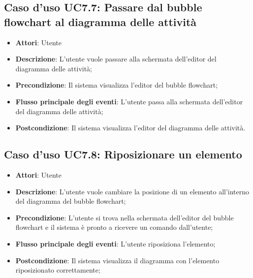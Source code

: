 \documentclass[../AnalisiDeiRequisiti.tex]{subfiles}
\begin{document}
				\subsection{Caso d'uso UC7.7: Passare dal bubble flowchart al diagramma delle attività}
				\begin{itemize}
					\item \textbf{Attori}: Utente
					\item \textbf{Descrizione}: L'utente vuole passare alla schermata dell'editor del diagramma delle attività;
					\item \textbf{Precondizione}: Il sistema visualizza l'editor del bubble flowchart;
					\item \textbf{Flusso principale degli eventi}: L'utente passa alla schermata dell'editor del diagramma delle attività;
					\item \textbf{Postcondizione}: Il sistema visualizza l'editor del diagramma delle attività.
				\end{itemize}
				\subsection{Caso d'uso UC7.8: Riposizionare un elemento}
				\begin{itemize}
					\item \textbf{Attori}: Utente
					\item \textbf{Descrizione}: L'utente vuole cambiare la posizione di un elemento all'interno del diagramma del bubble flowchart;
					\item \textbf{Precondizione}: L'utente si trova nella schermata dell'editor del bubble flowchart e il sistema è pronto a ricevere un comando dall'utente;
					\item \textbf{Flusso principale degli eventi}: L'utente riposiziona l'elemento;
					\item \textbf{Postcondizione}: Il sistema visualizza il diagramma con l'elemento riposizionato correttamente;
				\end{itemize}
\end{document}
